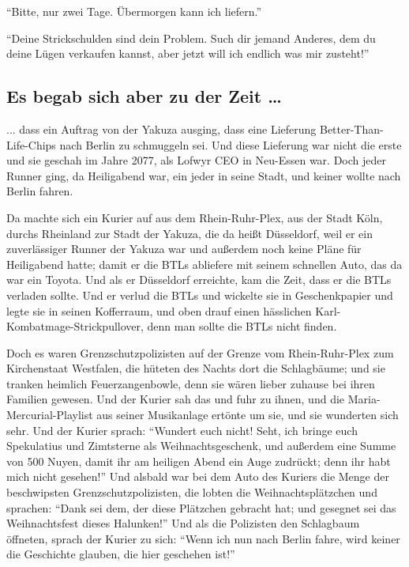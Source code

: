 \enquote{Bitte, nur zwei Tage. Übermorgen kann ich liefern.}

\enquote{Deine Strickschulden sind dein Problem. Such dir jemand Anderes, dem du deine Lügen verkaufen kannst, aber jetzt will ich endlich was mir zusteht!}

\subsection{Es begab sich aber zu der Zeit …}
... dass ein Auftrag von der Yakuza ausging, dass eine Lieferung Better-Than-Life-Chips nach Berlin zu schmuggeln sei.
Und diese Lieferung war nicht die erste und sie geschah im Jahre 2077, als Lofwyr CEO in Neu-Essen war.
Doch jeder Runner ging, da Heiligabend war, ein jeder in seine Stadt, und keiner wollte nach Berlin fahren.

Da machte sich ein Kurier auf aus dem Rhein-Ruhr-Plex, aus der Stadt Köln, durchs Rheinland zur Stadt der Yakuza, die da heißt Düsseldorf, weil er ein zuverlässiger Runner der Yakuza war und außerdem noch keine Pläne für Heiligabend hatte; damit er die BTLs abliefere mit seinem schnellen Auto, das da war ein Toyota.
Und als er Düsseldorf erreichte, kam die Zeit, dass er die BTLs verladen sollte.
Und er verlud die BTLs und wickelte sie in Geschenkpapier und legte sie in seinen Kofferraum, und oben drauf einen hässlichen Karl-Kombatmage-Strickpullover, denn man sollte die BTLs nicht finden.

Doch es waren Grenzschutzpolizisten auf der Grenze vom Rhein-Ruhr-Plex zum Kirchenstaat Westfalen, die hüteten des Nachts dort die Schlagbäume; und sie tranken heimlich Feuerzangenbowle, denn sie wären lieber zuhause bei ihren Familien gewesen.
Und der Kurier sah das und fuhr zu ihnen, und die Maria-Mercurial-Playlist aus seiner Musikanlage ertönte um sie, und sie wunderten sich sehr.
Und der Kurier sprach: \enquote{Wundert euch nicht! Seht, ich bringe euch Spekulatius und Zimtsterne als Weihnachtsgeschenk, und außerdem eine Summe von 500 Nuyen, damit ihr am heiligen Abend ein Auge zudrückt; denn ihr habt mich nicht gesehen!}
Und alsbald war bei dem Auto des Kuriers die Menge der beschwipsten Grenzschutzpolizisten, die lobten die Weihnachtsplätzchen und sprachen:
\enquote{Dank sei dem, der diese Plätzchen gebracht hat; und gesegnet sei das Weihnachtsfest dieses Halunken!}
Und als die Polizisten den Schlagbaum öffneten, sprach der Kurier zu sich:
\enquote{Wenn ich nun nach Berlin fahre, wird keiner die Geschichte glauben, die hier geschehen ist!}

